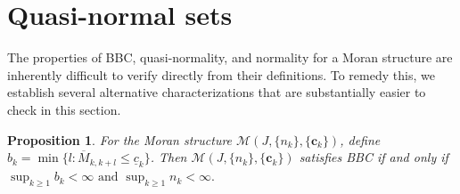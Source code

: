 \documentclass[12pt]{amsart}
\numberwithin{equation}{section}
\theoremstyle{plain}
\newtheorem{proposition}[theorem]{Proposition}
\theoremstyle{remark}
\theoremstyle{definition}
\newcommand{\om}{\overline{M}}
\newcommand{\ccc}{\mathbf{c}}
\newcommand{\uc}{\underline{c}}
\renewcommand{\ge}{\geqslant}
\renewcommand{\le}{\leqslant}
\begin{document}
	
	
	
	\section{ Quasi-normal sets }\label{sec_qhs}
The properties of BBC, quasi-normality, and normality for a Moran structure are inherently difficult to verify directly from their definitions. To remedy this, we establish several alternative characterizations that are substantially easier to check in this section.	
	
	

	\begin{proposition}\label{BC}
		For the Moran structure $\mathcal{M}(J,\{n_k\},\{\ccc_k\})$, define  $b_k=\min\big\{l:\om_{k,k+l}\le \uc_k\big\}$. Then $\mathcal{M}(J,\{n_k\},\{\ccc_k\})$ satisfies BBC  if and only if $	\sup_{k\ge 1} b_k <\infty \text{\ and } \sup_{k\ge 1} n_k<\infty.$	\end{proposition}
	
\end{document}

